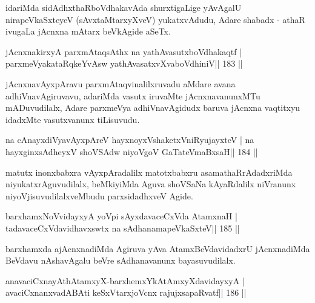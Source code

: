 \begin{artha}
idariMda sidAdhxthaRboVdhakavAda shurxtigaLige yAvAgalU nirapeVkaSxteyeV (sAvxtaMtarxyXveV) yukatxvAdudu, Adare shabadx - athaR ivugaLa jAcnxna mAtarx beVkAgide aSeTx.
\end{artha}

\begin{shl}
jAcnxnakirxyA parxmAtaqsAthx na yathAvasutxboVdhakaqtf |
parxmeVyakataRqkeYvAsw yathAvasatxvXvaboVdhiniV\hfill || 183 ||
\end{shl}

\begin{artha}
jAcnxnavAyxpAravu parxmAtaqvinalilxruvadu aMdare avana adhiVnavAgiruvavu, adariMda vasutx iruvaMte jAcnxnavanunxMTu mADuvudilalx, Adare parxmeVya adhiVnavAgidudx baruva jAcnxna vaqtitxyu idadxMte vasutxvanunx tiLisuvudu.
\end{artha}


\begin{shl}
na cAnayxdiVyavAyxpAreV hayxnoyxV\s shaketxVniRyujayxteV |
na hayxginxsAdheyxV shoVSAdw niyoVgoV GaTateV\s maBxsaH\hfill || 184 ||
\end{shl}

\begin{artha}
matutx inonxbabxra vAyxpAradalilx matotxbabxru asamathaRrAdadxriMda niyukatxrAgu\-vudilalx, beMkiyiMda Aguva shoVSaNa kAyaRdalilx niVranunx niyoVjisuvudilalx\-veMbudu parxsidadhxveV Agide.
\end{artha}


\begin{shl}
barxhamxNoV\s vidayxyA yoV\s pi sAyxdavaceCxVda AtamxnaH |
tadavaceCxVdavidhavxswtx na sAdhanamapeVkaSxteV\hfill || 185 ||
\end{shl}

\begin{artha}
barxhamxda ajAcnxnadiMda Agiruva yAva AtamxBeVdavidadxrU jAcnxnadiMda BeVdavu nAshavAgalu beVre sAdhanavanunx bayasuvudilalx.
\end{artha}


\begin{shl}
anavaciCxnayAthAtamxyX-barxhemxYkAtAmxyXdavidayxyA |
avaciCxnanxvadABAti keSxVtarxjoVcnx rajujxsapaRvatf\hfill || 186 ||
\end{shl}

